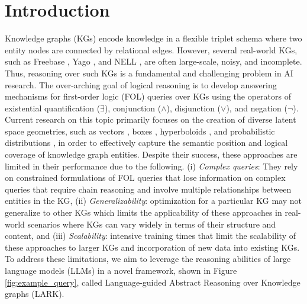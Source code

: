 \documentclass{article} %
\newcommand{\model}{LARK}
\newcommand{\fullmodel}{Language-guided Abstract Reasoning over Knowledge graphs}
\begin{document}
\section{Introduction}
\label{sec:intro}
 Knowledge graphs (KGs) encode knowledge in a flexible triplet schema where two entity nodes are connected by relational edges. However, several real-world KGs, such as Freebase \citep{bollacker2008freebase}, Yago \citep{yago2007suchanek}, and NELL \citep{carlson2010toward}, are often large-scale, noisy, and incomplete. Thus, reasoning over such KGs is a fundamental and challenging problem in AI research. The over-arching goal of logical reasoning is to develop answering mechanisms for first-order logic (FOL) queries over KGs using the operators of existential quantification ($\exists$), conjunction ($\wedge$), disjunction ($\vee$), and negation ($\neg$). Current research on this topic primarily focuses on the creation of diverse latent space geometries, such as vectors \citep{hamilton2018embedding}, boxes \citep{ren2020query2box}, hyperboloids \citep{choudhary2021self}, and probabilistic distributions \citep{ren2020beta}, in order to effectively capture the semantic position and logical coverage of knowledge graph entities. Despite their success, these approaches are limited in their performance due to the following. (i) \textit{Complex queries}: They rely on constrained formulations of FOL queries that lose information on complex queries that require chain reasoning \citep{choudhary2021probabilistic} and involve multiple relationships between entities in the KG, (ii) \textit{Generalizability}: optimization for a particular KG may not generalize to other KGs which limits the applicability of these approaches in real-world scenarios where KGs can vary widely in terms of their structure and content, and (iii) \textit{Scalability}: intensive training times that limit the scalability of these approaches to larger KGs and incorporation of new data into existing KGs. To address these limitations, we aim to leverage the reasoning abilities of large language models (LLMs) in a novel framework, shown in Figure \ref{fig:example_query}, called {\fullmodel} ({\model}). %
\end{document}
